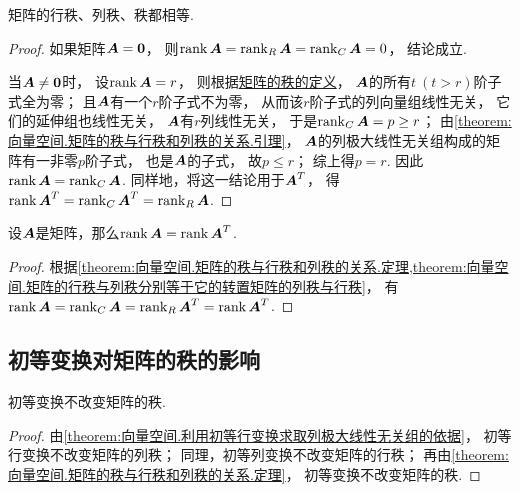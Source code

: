 \begin{theorem}\label{theorem:向量空间.矩阵的秩与行秩和列秩的关系.定理}
矩阵的行秩、列秩、秩都相等.
\begin{proof}
如果矩阵\(\boldsymbol{A} = \boldsymbol{0}\)，
则\(\rank\boldsymbol{A}=\rank_R\boldsymbol{A}=\rank_C\boldsymbol{A}=0\)，
结论成立.

当\(\boldsymbol{A}\neq\boldsymbol{0}\)时，
设\(\rank\boldsymbol{A}=r\)，
则根据\hyperref[definition:线性方程组.矩阵的秩的定义]{矩阵的秩的定义}，
\(\boldsymbol{A}\)的所有\(t\ (t > r)\)阶子式全为零；
且\(\boldsymbol{A}\)有一个\(r\)阶子式不为零，
从而该\(r\)阶子式的列向量组线性无关，
它们的延伸组也线性无关，
\(\boldsymbol{A}\)有\(r\)列线性无关，
于是\(\rank_C\boldsymbol{A}=p \geq r\)；
由\cref{theorem:向量空间.矩阵的秩与行秩和列秩的关系.引理}，
\(\boldsymbol{A}\)的列极大线性无关组构成的矩阵有一非零\(p\)阶子式，
也是\(\boldsymbol{A}\)的子式，
故\(p \leq r\)；
综上得\(p = r\).
因此\(\rank\boldsymbol{A}=\rank_C\boldsymbol{A}\).
同样地，将这一结论用于\(\boldsymbol{A}^T\)，
得\(\rank\boldsymbol{A}^T=\rank_C\boldsymbol{A}^T=\rank_R\boldsymbol{A}\).
\end{proof}
\end{theorem}

\begin{theorem}
设\(\boldsymbol{A}\)是矩阵，那么\(\rank\boldsymbol{A} = \rank\boldsymbol{A}^T\).
\begin{proof}
根据\cref{theorem:向量空间.矩阵的秩与行秩和列秩的关系.定理,theorem:向量空间.矩阵的行秩与列秩分别等于它的转置矩阵的列秩与行秩}，
有\(\rank\boldsymbol{A}=\rank_C\boldsymbol{A}=\rank_R\boldsymbol{A}^T=\rank\boldsymbol{A}^T\).
\end{proof}
\end{theorem}

\subsection{初等变换对矩阵的秩的影响}
\begin{theorem}\label{theorem:线性方程组.初等变换不变秩}
初等变换不改变矩阵的秩.
\begin{proof}
由\cref{theorem:向量空间.利用初等行变换求取列极大线性无关组的依据}，
初等行变换不改变矩阵的列秩；
同理，初等列变换不改变矩阵的行秩；
再由\cref{theorem:向量空间.矩阵的秩与行秩和列秩的关系.定理}，
初等变换不改变矩阵的秩.
\end{proof}
\end{theorem}

